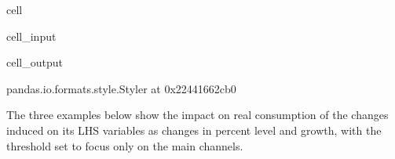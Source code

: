 \documentclass[letterpaper,10pt,english]{jupyterBook}
\begin{document}
\begin{sphinxuseclass}{cell}\begin{sphinxVerbatimInput}

\begin{sphinxuseclass}{cell_input}
\begin{sphinxVerbatim}[commandchars=\\\{\}]
\end{sphinxVerbatim}

\end{sphinxuseclass}\end{sphinxVerbatimInput}
\begin{sphinxVerbatimOutput}

\begin{sphinxuseclass}{cell_output}
\begin{sphinxVerbatim}[commandchars=\\\{\}]
\PYGZlt{}pandas.io.formats.style.Styler at 0x22441662cb0\PYGZgt{}
\end{sphinxVerbatim}

\end{sphinxuseclass}\end{sphinxVerbatimOutput}

\end{sphinxuseclass}
\sphinxAtStartPar
The three examples below show the impact on real consumption of the changes induced on its LHS variables as changes in percent level and growth, with the threshold set to focus only on the main channels.
\end{document}
